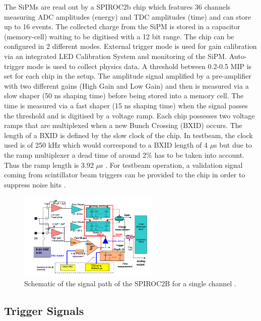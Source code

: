 \documentclass[twoside,a4paper,11pt]{article}
\begin{document}
The SiPMs are read out by a SPIROC2b chip which features 36 channels measuring ADC amplitudes (energy) and TDC amplitudes (time) and can store up to 16 events. The collected charge from the SiPM is stored in a capacitor (memory-cell) waiting to be digitised with a 12 bit range. The chip can be configured in 2 different modes. External trigger mode is used for gain calibration via an integrated LED Calibration System and monitoring of the SiPM. Auto-trigger mode is used to collect physics data. A threshold between 0.2-0.5 MIP is set for each chip in the setup. The amplitude signal amplified by a pre-amplifier with two different gains (High Gain and Low Gain) and then is measured via a slow shaper (50 ns shaping time) before being stored into a memory cell. The time is measured via a fast shaper (15 ns shaping time) when the signal passes the threshold and is digitised by a voltage ramp. Each chip possesses two voltage ramps that are multiplexed when a new Bunch Crossing (BXID) occurs. The length of a BXID is defined by the slow clock of the chip. In testbeam, the clock used is of 250 kHz which would correspond to a BXID length of 4 $\mu$s but due to the ramp multiplexer a dead time of around 2\% has to be taken into account. Thus the ramp length is 3.92 $\mu$s \cite{EldwanSSP}. For testbeam operation, a validation signal coming from scintillator beam triggers can be provided to the chip in order to suppress noise hits \cite{DAQ}.\\
\begin{figure}[htbp]
\begin{center}
\includegraphics[width=0.6\textwidth]{fig/Spiroc_layout.png}
\caption{Schematic of the signal path of the SPIROC2B for a single channel \cite{SPIROCManual}.}
\label{fig:SPIROC2B}
\end{center}
\end{figure}

\subsection{Trigger Signals}
\label{subsec:trigger}
\end{document}
